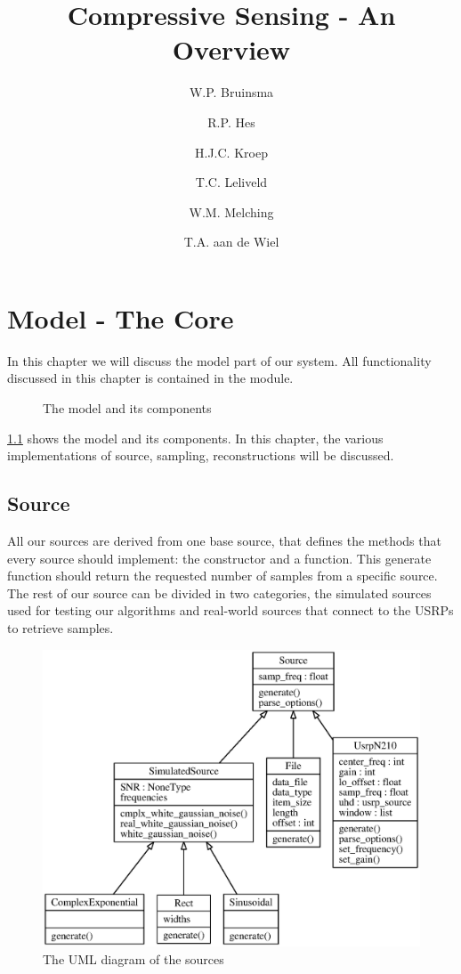 \documentclass[a4paper, openany, oneside]{memoir}
\title{Compressive Sensing - An Overview}
\author{W.P. Bruinsma \and R.P. Hes \and H.J.C. Kroep \and T.C. Leliveld \and W.M. Melching \and T.A. aan de Wiel}
\begin{document}
\chapter{Model - The Core}
\label{cha:model}
In this chapter we will discuss the model part of our system. All functionality discussed in this chapter is contained in the  module. 

\begin{figure}[h]
    \centering
    \begin{adjustbox}{width=\textwidth}
    
    \end{adjustbox}
    \caption{The model and its components}
    \label{fig:model-diagram}
\end{figure}

\cref{fig:model-diagram} shows the model and its components. In this chapter, the various implementations of source, sampling, reconstructions will be discussed. 

\section{Source}
\label{sec:source}
All our sources are derived from one base source, that defines the methods that every source should implement: the constructor and a  function. This generate function should return the requested number of samples from a specific source. The rest of our source can be divided in two categories, the simulated sources used for testing our algorithms and real-world sources that connect to the USRPs to retrieve samples.

\begin{figure}
    \centering
    \includegraphics[width=\linewidth]{figures/classes_source.eps}
    \caption{The UML diagram of the sources}
    \label{fig:umlsource}
\end{figure}
\end{document}

